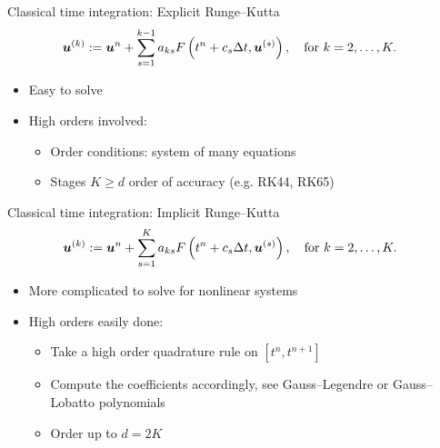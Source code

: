 \documentclass[aspectratio=169]{beamer}
\begin{document}
\begin{frame}{Classical time integration: Explicit Runge--Kutta}
\begin{align*}
	&\boldsymbol{u}^{(k)}:=\boldsymbol{u}^n+\sum_{s=1}^{k-1} a_{ks} F\left(t^n+c_s\Delta t,\boldsymbol{u}^{(s)}\right),\quad \text{for } k=2,\dots, K.
\end{align*}

\begin{itemize}
\item Easy to solve
\item High orders involved:
\begin{itemize}
\item Order conditions: system of many equations
\item Stages  $K\geq d$ order of accuracy (e.g. RK44, RK65) 
\end{itemize}
\end{itemize} 
 
\end{frame}

\begin{frame}{Classical time integration: Implicit Runge--Kutta}
\begin{align*}
	&\boldsymbol{u}^{(k)}:=\boldsymbol{u}^n+\sum_{s=1}^{K} a_{ks} F\left(t^n+c_s\Delta t,\boldsymbol{u}^{(s)}\right), \quad \text{for } k=2,\dots, K.
\end{align*}

\begin{itemize}
\item More complicated to solve for nonlinear systems
\item High orders easily done:
\begin{itemize}
\item Take a high order quadrature rule on $[t^n,t^{n+1}]$
\item Compute the coefficients accordingly, see Gauss--Legendre or Gauss--Lobatto polynomials
\item Order up to $d=2K$ 
\end{itemize}
\end{itemize} 
 
\end{frame}
\end{document}
